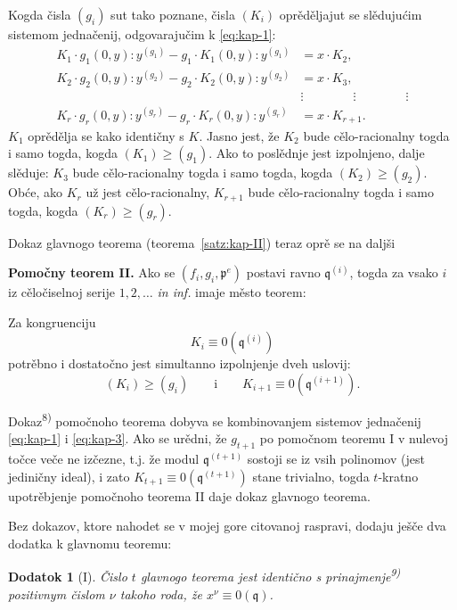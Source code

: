 \documentclass[11pt]{article}
\theoremstyle{plain}
\newtheorem{zusatz}{Dodatok}
\begin{document}
Kogda čisla $(g_{i})$ sut tako poznane, čisla $(K_{i})$ oprěděljajut
se slědujućim sistemom jednačenij, odgovarajučim k \eqref{eq:kap-1}:
\begin{equation}\label{eq:kap-3}
\begin{aligned}
K_{1}\cdot g_{1}(0,y):y^{(g_{1})} - g_{1}\cdot K_{1}(0,y):y^{(g_{1})} &= x\cdot K_{2},\\
K_{2}\cdot g_{2}(0,y):y^{(g_{2})} - g_{2}\cdot K_{2}(0,y):y^{(g_{2})} &= x\cdot K_{3},\\
&\vdots \qquad\qquad\vdots\qquad\qquad\vdots\\
K_{r}\cdot g_{r}(0,y):y^{(g_{r})} - g_{r}\cdot K_{r}(0,y):y^{(g_{r})} &= x\cdot K_{r+1}.
\end{aligned}
\end{equation}
$K_{1}$ oprědělja se kako identičny s $K$. Jasno jest, že $K_{2}$
bude cělo-racionalny togda i samo togda, kogda
$(K_{1}) \geq (g_{1})$. Ako to poslědnje jest izpolnjeno, dalje
slěduje: $K_{3}$ bude cělo-racionalny togda i samo togda, kogda
$(K_{2}) \geq (g_{2})$. Obće, ako $K_{r}$ už jest cělo-racionalny,
$K_{r+1}$ bude cělo-racionalny togda i samo togda, kogda
$(K_{r}) \geq (g_{r})$.

Dokaz glavnogo teorema (teorema~\ref{satz:kap-II}) teraz oprě se na
daljši

\smallskip
\textbf{Pomočny teorem II.} Ako se
$(f_{i}, g_{i}, \mathfrak{p}^{e})$ postavi ravno
$\mathfrak{q}^{(i)}$, togda za vsako $i$ iz cěločiselnoj serije
$1, 2, \ldots$ \textit{in inf.} imaje město teorem:

Za kongruenciju
\[
K_{i} \equiv 0(\mathfrak{q}^{(i)})
\]
potrěbno i dostatočno jest simultanno izpolnjenje dveh uslovij:
\[
(K_{i}) \geq (g_{i}) \qquad \text{i} \qquad K_{i+1} \equiv 0(\mathfrak{q}^{(i+1)}).
\]

Dokaz\textsuperscript{8)} pomočnoho teorema dobyva se kombinovanjem
sistemov jednačenij \eqref{eq:kap-1} i \eqref{eq:kap-3}. Ako se
urědni, že $g_{t+1}$ po pomočnom teoremu I v nulevoj točce veče ne
izčezne, t.j. že modul $\mathfrak{q}^{(t+1)}$ sostoji se iz vsih
polinomov (jest jediničny ideal), i zato
$K_{t+1} \equiv 0(\mathfrak{q}^{(t+1)})$ stane trivialno, togda
$t$-kratno upotrěbjenje pomočnoho teorema II daje dokaz glavnogo
teorema.

\smallskip
Bez dokazov, ktore nahodet se v mojej gore citovanoj raspravi,
dodaju ješče dva dodatka k glavnomu teoremu:

\begin{zusatz}[I]
Čislo $t$ glavnogo teorema jest identično s prinajmenje\textsuperscript{9)}
pozitivnym čislom $\nu$ takoho roda, že
$x^{\nu} \equiv 0(\mathfrak{q})$.
\end{zusatz}
\end{document}
